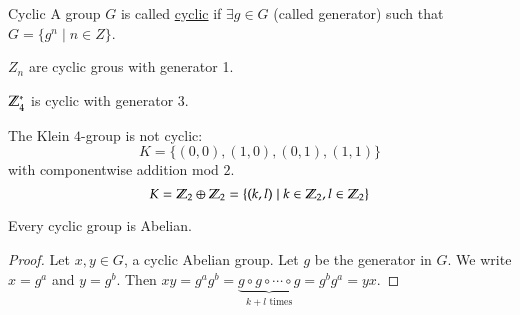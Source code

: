 \begin{defn}{Cyclic}
	A group $G$ is called \ul{cyclic} if $\exists g\in G$ (called generator) such that $G = \{g^n\mid n\in Z\}$. 
\end{defn}
\example
$Z_n$ are cyclic grous with generator 1. 

$\mathbb{Z}_4^*$ is cyclic with generator $3$. 

\example The Klein $4$-group is not cyclic: 
\[K = \{(0,0), (1,0), (0,1), (1,1)\}\]
with componentwise addition mod $2$. 
\[K = \mathbb{Z}_2\oplus \mathbb{Z}_2 = \{(k,l)\mid k\in \mathbb{Z}_2, l\in \mathbb{Z}_2\}\]

\begin{proposition}
Every cyclic group is Abelian. 	
\end{proposition}
\begin{proof}
Let $x, y\in G$, a cyclic Abelian group. Let $g$ be the generator in $G$. We write $x = g^a$ and $y = g^b$. Then $\displaystyle xy = g^ag^b = \underbrace{g\circ g\circ \cdots \circ g}_{\text{$k+l$ times}} = g^bg^a = yx$. 
\end{proof}

